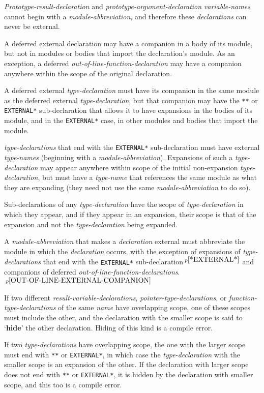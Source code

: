 \documentclass[12pt]{article}
\newcommand{\key}[1]{{\rm \bfseries #1}}
\newcommand{\pagnote}[1]{$\,^{p\pageref{#1}}$}
\begin{document}
{\em Prototype-result-declaration} and {\em prototype-argument-declaration}
{\em variable-names} cannot begin with a {\em module-abbreviation},
and therefore these {\em declarations} can never be external.

A deferred external declaration may have a companion in a body of its module,
but not in modules or bodies that import the declaration's module.
As an exception, a deferred {\em out-of-line-function-declaration}
may have a companion
anywhere within the scope of the original declaration.

A deferred external {\em type-declaration} must have its
companion in the same module as the deferred external {\em type-declaration},
but that companion may have the {\tt ***} or {\tt *EXTERNAL*}
sub-declaration that allows it to have expansions in the bodies of
its module, and in the {\tt *EXTERNAL*} case, in other modules and
bodies that import the module.

{\em type-declarations} that end with the {\tt *EXTERNAL*}
sub-declaration must have external {\em type-names}
(beginning with a {\em module-abbreviation}).
Expansions of such a {\em type-declaration} may appear
anywhere within scope of the initial non-expansion {\em type-declaration},
but must have a {\em type-name} that references the same module
as what they are expanding (they need not use the same
{\em module-abbreviation} to do so).

Sub-declarations of any {\em type-declaration} have the scope of
{\em type-declaration} in which they appear, and if they appear in
an expansion, their scope is that of the expansion and not
the {\em type-declaration} being expanded.  

A {\em module-abbreviation} that makes a {\em declaration} external
must abbreviate the module in which the {\em declaration} occurs,
with the exception of expansions of {\em type-declar\-ations}
that end with the {\tt *EXTERNAL*} sub-declaration\pagnote{*EXTERNAL*}
and companions of deferred
{\em out-of-line-function-declarations}.\pagnote{OUT-OF-LINE-EXTERNAL-COMPANION}

If two different {\em result-variable-declarations},
{\em pointer-type-declarations}, or {\em function-type-de\-clar\-a\-tions}
of the same {\em name} have overlapping
scope, one of these scopes must include the other,
and the declaration with the smaller scope is said to 
`\key{hide}'\label{HIDE} the other declaration.
Hiding of this kind is a compile error.

If two {\em type-declarations} have overlapping scope, the one
with the larger scope must end with {\tt ***} or {\tt *EXTERNAL*},
in which case the {\em type-declaration} with the smaller scope
is an expansion of the other.   If the declaration with larger
scope does not end with {\tt ***} or {\tt *EXTERNAL*}, it is
hidden by the declaration with smaller scope, and this too is
a compile error.
\end{document}
